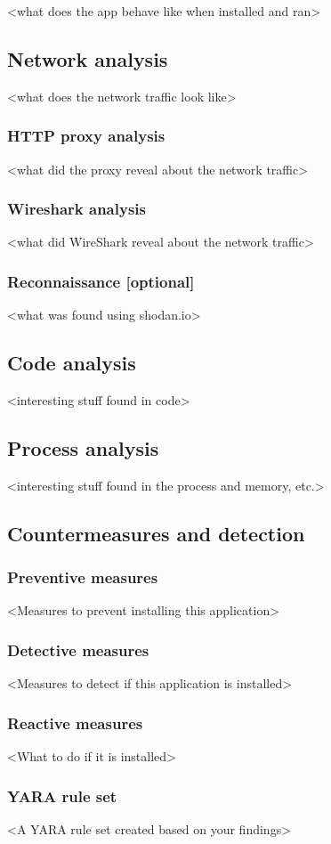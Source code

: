 <what does the app behave like when installed and ran>

\newpage
\subsection{Network analysis}

<what does the network traffic look like>

\subsubsection{HTTP proxy analysis}

<what did the proxy reveal about the network traffic>

\subsubsection{Wireshark analysis}

<what did WireShark reveal about the network traffic>

\subsubsection{Reconnaissance [optional]}

<what was found using shodan.io>

\newpage
\subsection{Code analysis}

<interesting stuff found in code>

\newpage
\subsection{Process analysis}

<interesting stuff found in the process and memory, etc.>

\newpage
\subsection{Countermeasures and detection}

\subsubsection{Preventive measures}


<Measures to prevent installing this application>

\subsubsection{Detective measures}

<Measures to detect if this application is installed>

\subsubsection{Reactive measures}

<What to do if it is installed>

\subsubsection{YARA rule set}

<A YARA rule set created based on your findings>

